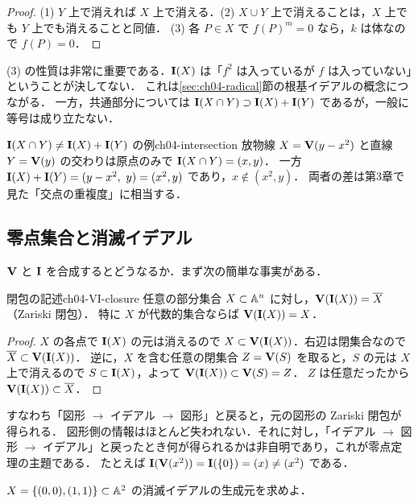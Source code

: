 \begin{proof}
(1) $Y$ 上で消えれば $X$ 上で消える．(2) $X\cup Y$ 上で消えることは，$X$ 上でも $Y$ 上でも消えることと同値．
(3) 各 $P\in X$ で $f(P)^m=0$ なら，$k$ は体なので $f(P)=0$．
\end{proof}

(3) の性質は非常に重要である．$\mathbf{I}(X)$ は「$f^2$ は入っているが $f$ は入っていない」ということが決してない．
これは\ref{sec:ch04-radical}節の根基イデアルの概念につながる．
一方，共通部分については $\mathbf{I}(X\cap Y)\supset\mathbf{I}(X)+\mathbf{I}(Y)$ であるが，一般に等号は成り立たない．

\begin{myex}{$\mathbf{I}(X\cap Y)\ne\mathbf{I}(X)+\mathbf{I}(Y)$ の例}{ch04-intersection}
放物線 $X=\mathbf{V}(y-x^2)$ と直線 $Y=\mathbf{V}(y)$ の交わりは原点のみで $\mathbf{I}(X\cap Y)=(x,y)$．
一方 $\mathbf{I}(X)+\mathbf{I}(Y)=(y-x^2,\ y)=(x^2,y)$ であり，$x\notin(x^2,y)$．
両者の差は第3章で見た「交点の重複度」に相当する．
\end{myex}

\subsection{零点集合と消滅イデアル}

$\mathbf{V}$ と $\mathbf{I}$ を合成するとどうなるか．まず次の簡単な事実がある．

\begin{myprop}{閉包の記述}{ch04-VI-closure}
任意の部分集合 $X\subset\mathbb{A}^n$ に対し，$\mathbf{V}(\mathbf{I}(X))=\overline X$（Zariski 閉包）．
特に $X$ が代数的集合ならば $\mathbf{V}(\mathbf{I}(X))=X$．
\end{myprop}

\begin{proof}
$X$ の各点で $\mathbf{I}(X)$ の元は消えるので $X\subset\mathbf{V}(\mathbf{I}(X))$．右辺は閉集合なので $\overline X\subset\mathbf{V}(\mathbf{I}(X))$．
逆に，$X$ を含む任意の閉集合 $Z=\mathbf{V}(S)$ を取ると，$S$ の元は $X$ 上で消えるので $S\subset\mathbf{I}(X)$，よって $\mathbf{V}(\mathbf{I}(X))\subset\mathbf{V}(S)=Z$．
$Z$ は任意だったから $\mathbf{V}(\mathbf{I}(X))\subset\overline X$．
\end{proof}

すなわち「図形 $\to$ イデアル $\to$ 図形」と戻ると，元の図形の Zariski 閉包が得られる．
図形側の情報はほとんど失われない．それに対し，「イデアル $\to$ 図形 $\to$ イデアル」と戻ったとき何が得られるかは非自明であり，これが零点定理の主題である．
たとえば $\mathbf{I}(\mathbf{V}(x^2))=\mathbf{I}(\{0\})=(x)\ne(x^2)$ である．

 $X=\{(0,0),(1,1)\}\subset\mathbb{A}^2$ の消滅イデアルの生成元を求めよ．

